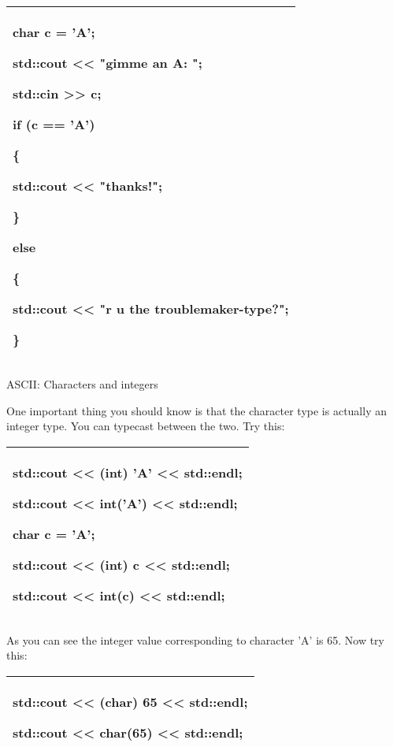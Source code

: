\documentclass[
]{article}
\begin{document}
\begin{longtable}[]{@{}l@{}}
\toprule
\endhead
\begin{minipage}[t]{0.97\columnwidth}\raggedright
char c = 'A';

std::cout \textless\textless{} "gimme an A: ";

std::cin \textgreater\textgreater{} c;

if (c == 'A')

\{

std::cout \textless\textless{} "thanks!";

\}

else

\{

std::cout \textless\textless{} "r u the troublemaker-type?";

\}\strut
\end{minipage}\tabularnewline
\bottomrule
\end{longtable}

ASCII: Characters and integers

One important thing you should know is that the character type is
actually an integer type. You can typecast between the two. Try this:

\begin{longtable}[]{@{}l@{}}
\toprule
\endhead
\begin{minipage}[t]{0.97\columnwidth}\raggedright
std::cout \textless\textless{} (int) 'A' \textless\textless{} std::endl;

std::cout \textless\textless{} int('A') \textless\textless{} std::endl;

char c = 'A';

std::cout \textless\textless{} (int) c \textless\textless{} std::endl;

std::cout \textless\textless{} int(c) \textless\textless{}
std::endl;\strut
\end{minipage}\tabularnewline
\bottomrule
\end{longtable}

As you can see the integer value corresponding to character 'A' is 65.
Now try this:

\begin{longtable}[]{@{}l@{}}
\toprule
\endhead
\begin{minipage}[t]{0.97\columnwidth}\raggedright
std::cout \textless\textless{} (char) 65 \textless\textless{} std::endl;

std::cout \textless\textless{} char(65) \textless\textless{}
std::endl;\strut
\end{minipage}\tabularnewline
\bottomrule
\end{longtable}
\end{document}
